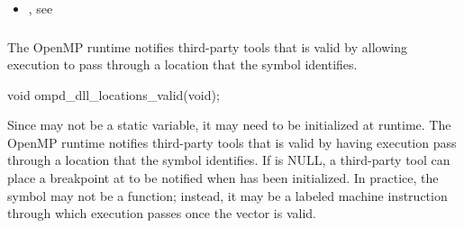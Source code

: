 \crossreferences
\begin{itemize}
\item   {}, 
see 
\end{itemize}



\subsubsection{}
\label{subsubsec:ompd_dll_locations_valid}

\summary
The OpenMP runtime notifies third-party tools that 
is valid by allowing execution to pass through a location that the symbol 
 identifies.

\format
\begin{cspecific}
\begin{ompSyntax}
void ompd_dll_locations_valid(void);
\end{ompSyntax}
\end{cspecific}

\descr
Since  may not be a static variable, it may need 
to be initialized at runtime. The OpenMP runtime notifies third-party tools
that  is valid by having execution pass through a 
location that the symbol  identifies. If 
 is NULL, a third-party tool can place a breakpoint 
at  to be notified when  
has been initialized. In practice, the symbol  
may not be a function; instead, it may be a labeled machine instruction through
which execution passes once the vector is valid.

